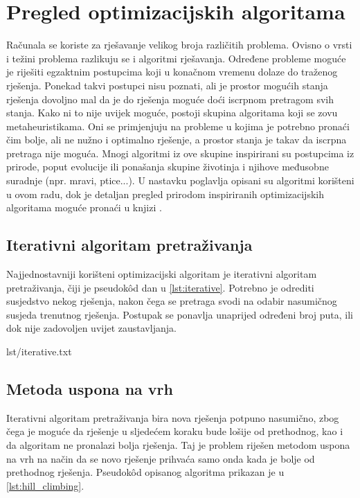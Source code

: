 \chapter{Pregled optimizacijskih algoritama}
Računala se koriste za rješavanje velikog broja različitih problema.
Ovisno o vrsti i težini problema razlikuju se i algoritmi rješavanja.
Određene probleme moguće je riješiti egzaktnim postupcima koji u konačnom vremenu dolaze do traženog rješenja.
Ponekad takvi postupci nisu poznati, ali je prostor mogućih stanja rješenja dovoljno mal da je do rješenja moguće doći iscrpnom pretragom svih stanja.
Kako ni to nije uvijek moguće, postoji skupina algoritama koji se zovu metaheuristikama.
Oni se primjenjuju na probleme u kojima je potrebno pronaći čim bolje, ali ne nužno i optimalno rješenje, a prostor stanja je takav da iscrpna pretraga nije moguća.
Mnogi algoritmi iz ove skupine inspirirani su postupcima iz prirode, poput evolucije ili ponašanja skupine životinja i njihove međusobne suradnje (npr. mravi, ptice...).
U nastavku poglavlja opisani su algoritmi korišteni u ovom radu, dok je detaljan pregled prirodom inspiriranih optimizacijskih algoritama moguće pronaći u knjizi \cite{PrirodomInspirirani}.


\section{Iterativni algoritam pretraživanja}
Najjednostavniji korišteni optimizacijski algoritam je iterativni algoritam pretraživanja, čiji je pseudok\^{o}d dan u \ref{lst:iterative}.
Potrebno je odrediti susjedstvo nekog rješenja, nakon čega se pretraga svodi na odabir nasumičnog susjeda trenutnog rješenja.
Postupak se ponavlja unaprijed određeni broj puta, ili dok nije zadovoljen uvijet zaustavljanja.

\begin{minipage}{0.95\textwidth}
     {lst/iterative.txt}
\end{minipage}


\section{Metoda uspona na vrh}
Iterativni algoritam pretraživanja bira nova rješenja potpuno nasumično, zbog čega je moguće da rješenje u sljedećem koraku bude lošije od prethodnog, kao i da algoritam ne pronalazi bolja rješenja.
Taj je problem riješen metodom uspona na vrh na način da se novo rješenje prihvaća samo onda kada je bolje od prethodnog rješenja.
Pseudok\^{o}d opisanog algoritma prikazan je u \ref{lst:hill_climbing}.

